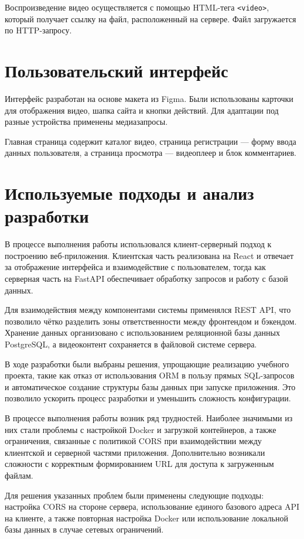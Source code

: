 Воспроизведение видео осуществляется с помощью HTML-тега \texttt{<video>}, который получает ссылку на файл, расположенный на сервере. Файл загружается по HTTP-запросу.

\section{Пользовательский интерфейс}

Интерфейс разработан на основе макета из Figma. Были использованы карточки для отображения видео, шапка сайта и кнопки действий. Для адаптации под разные устройства применены медиазапросы.

Главная страница содержит каталог видео, страница регистрации — форму ввода данных пользователя, а страница просмотра — видеоплеер и блок комментариев.

\section{Используемые подходы и анализ разработки}

В процессе выполнения работы использовался клиент-серверный подход к построению веб-приложения. Клиентская часть реализована на React и отвечает за отображение интерфейса и взаимодействие с пользователем, тогда как серверная часть на FastAPI обеспечивает обработку запросов и работу с базой данных.

Для взаимодействия между компонентами системы применялся REST API, что позволило чётко разделить зоны ответственности между фронтендом и бэкендом. Хранение данных организовано с использованием реляционной базы данных PostgreSQL, а видеоконтент сохраняется в файловой системе сервера.

В ходе разработки были выбраны решения, упрощающие реализацию учебного проекта, такие как отказ от использования ORM в пользу прямых SQL-запросов и автоматическое создание структуры базы данных при запуске приложения. Это позволило ускорить процесс разработки и уменьшить сложность конфигурации.

В процессе выполнения работы возник ряд трудностей. Наиболее значимыми из них стали проблемы с настройкой Docker и загрузкой контейнеров, а также ограничения, связанные с политикой CORS при взаимодействии между клиентской и серверной частями приложения. Дополнительно возникали сложности с корректным формированием URL для доступа к загруженным файлам.

Для решения указанных проблем были применены следующие подходы: настройка CORS на стороне сервера, использование единого базового адреса API на клиенте, а также повторная настройка Docker или использование локальной базы данных в случае сетевых ограничений.

